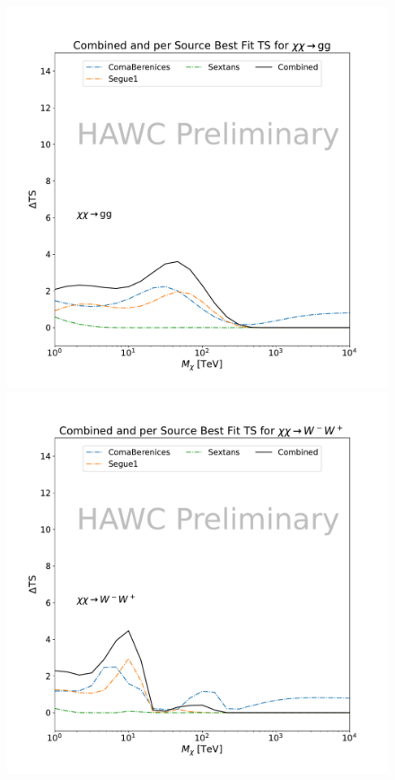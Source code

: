 \begin{figure}[h]
{    \includegraphics[scale=0.21]{figures/mtd_hawc_dm/results/CombinedTS_New_duck_gg_.pdf}
    \includegraphics[scale=0.21]{figures/mtd_hawc_dm/results/CombinedTS_New_duck_ww_.pdf}
}
\end{figure}
